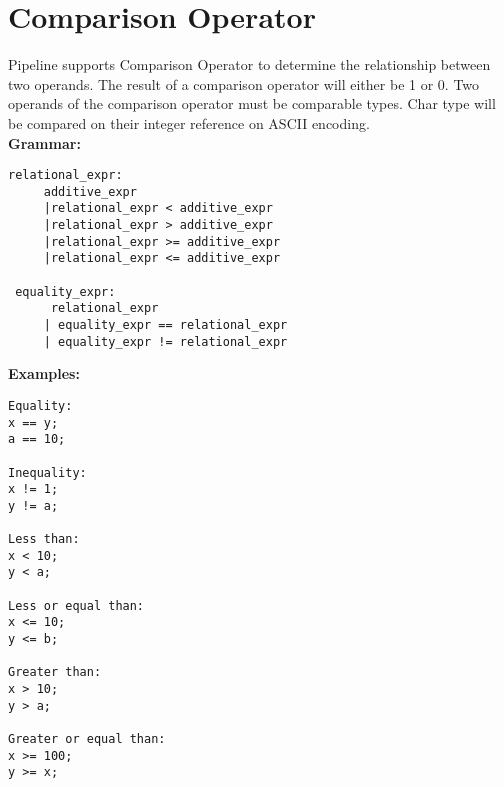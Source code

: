 \documentclass[./LRM_main.tex]{subfiles}
\begin{document}
\section{Comparison Operator}
Pipeline supports Comparison Operator to determine the relationship between two operands. The result of a comparison operator will either be 1 or 0. Two operands of the comparison operator must be comparable types. Char type will be compared on their integer reference on ASCII encoding.\\
\vspace{1 mm}
\textbf{Grammar:}
\begin{lstlisting}
relational_expr:
     additive_expr
     |relational_expr < additive_expr
     |relational_expr > additive_expr
     |relational_expr >= additive_expr
     |relational_expr <= additive_expr

 equality_expr:
      relational_expr 
     | equality_expr == relational_expr
     | equality_expr != relational_expr

\end{lstlisting}
\vspace{1 mm}
\textbf{Examples:}
\begin{lstlisting}
Equality:
x == y;
a == 10;

Inequality:
x != 1;
y != a;

Less than:
x < 10;
y < a;

Less or equal than:
x <= 10;
y <= b;

Greater than:
x > 10;
y > a;

Greater or equal than:
x >= 100;
y >= x;

\end{lstlisting}
\end{document}
